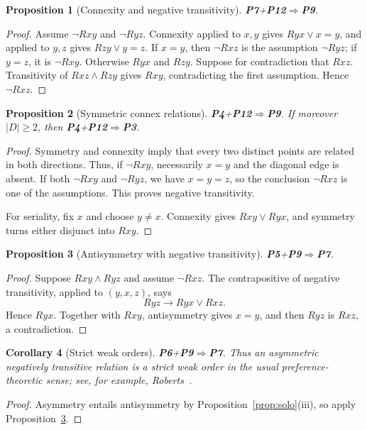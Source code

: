 \documentclass[11pt,a4paper,reqno]{amsart}
\newtheorem{proposition}{Proposition}[section]
\newtheorem{corollary}[proposition]{Corollary}
\theoremstyle{definition}
\theoremstyle{remark}
\newcommand{\prop}[1]{\textbf{P#1}}
\newcommand{\catentails}{\Rightarrow}
\begin{document}
\begin{proposition}[Connexity and negative transitivity]\label{prop:trans-connex}
\prop{7}+\prop{12}$\catentails$\prop{9}.
\end{proposition}
\begin{proof}
Assume $\neg Rxy$ and $\neg Ryz$.  Connexity applied to $x,y$ gives
$Ryx\vee x=y$, and applied to $y,z$ gives $Rzy\vee y=z$.
If $x=y$, then $\neg Rxz$ is the assumption $\neg Ryz$; if $y=z$, it is
$\neg Rxy$.  Otherwise $Ryx$ and $Rzy$.  Suppose for contradiction that
$Rxz$.  Transitivity of $Rxz\wedge Rzy$ gives $Rxy$, contradicting the first
assumption.  Hence $\neg Rxz$.
\end{proof}

\begin{proposition}[Symmetric connex relations]\label{prop:sym-connex}
\prop{4}+\prop{12}$\catentails$\prop{9}.  If moreover $|D|\ge2$, then
\prop{4}+\prop{12}$\catentails$\prop{3}.
\end{proposition}
\begin{proof}
Symmetry and connexity imply that every two distinct points are related in both
directions.  Thus, if $\neg Rxy$, necessarily $x=y$ and the diagonal edge is
absent.  If both $\neg Rxy$ and $\neg Ryz$, we have $x=y=z$, so the conclusion
$\neg Rxz$ is one of the assumptions.  This proves negative transitivity.

For seriality, fix $x$ and choose $y\ne x$.  Connexity gives $Rxy\vee Ryx$,
and symmetry turns either disjunct into $Rxy$.
\end{proof}

\begin{proposition}[Antisymmetry with negative transitivity]\label{prop:p5p9}
\prop{5}+\prop{9}$\catentails$\prop{7}.
\end{proposition}
\begin{proof}
Suppose $Rxy\wedge Ryz$ and assume $\neg Rxz$.  The contrapositive of negative
transitivity, applied to $(y,x,z)$, says
\[
Ryz\to Ryx\vee Rxz.
\]
Hence $Ryx$.  Together with $Rxy$, antisymmetry gives $x=y$, and then $Ryz$
is $Rxz$, a contradiction.
\end{proof}

\begin{corollary}[Strict weak orders]\label{cor:strictweak}
\prop{6}+\prop{9}$\catentails$\prop{7}.  Thus an asymmetric negatively transitive
relation is a strict weak order in the usual preference-theoretic sense; see,
for example, Roberts~\cite[Ch.~2]{Roberts1979}.
\end{corollary}
\begin{proof}
Asymmetry entails antisymmetry by Proposition~\ref{prop:solo}(iii), so apply
Proposition~\ref{prop:p5p9}.
\end{proof}
\end{document}
